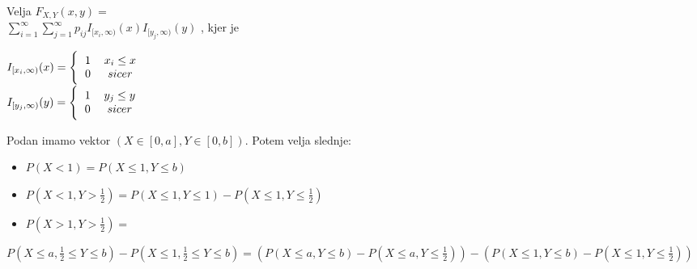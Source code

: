\documentclass{article}
\begin{document}
\begin{multicols}{3}
\begin{enumerate}
\begin{center}
        \end{center}
        Velja
        \begin{math}
            F_{X,Y}(x, y) =
        \end{math}\\
        \begin{math}
            \sum_{i = 1}^{\infty} \sum_{j = 1}^{\infty} p_{ij}  I_{[x_i, \infty)} (x) I_{[y_j, \infty)} (y)
        \end{math}
        , kjer je
        \begin{center}
            \begin{math}
                I_{[x_i, \infty)} (x) = 
                \Bigg\{\begin{tabular}{cc}
                    $1$  & $x_i \leq x$ \\
                    $0$  & $sicer$ \\
                  \end{tabular}
            \end{math} \\
            \begin{math}
                I_{[y_j, \infty)} (y) = 
                \Bigg\{\begin{tabular}{cc}
                    $1$  & $y_j \leq y$ \\
                    $0$  & $sicer$ \\
                  \end{tabular}
            \end{math}
        \end{center}
\end{enumerate}
Podan imamo vektor $(X \in [0, a], Y \in [0,b])$. Potem velja slednje:
\begin{itemize}
    \item $P(X < 1 ) = P(X \leq 1, Y \leq b)$
    \item $P(X < 1, Y > \frac{1}{2}) = P(X \leq 1, Y \leq 1) - P(X \leq 1, Y \leq \frac{1}{2})$
    \item \begin{math}
        P(X > 1, Y > \frac{1}{2}) = 
    \end{math}
\end{itemize}
\begin{center}
    \begin{small}
        \begin{math}
            P(X \leq a, \frac{1}{2} \leq Y \leq b) - P(X \leq 1, \frac{1}{2} \leq Y \leq b) =
            (P(X \leq a, Y \leq b) - P(X \leq a, Y \leq \frac{1}{2})) - (P(X \leq 1, Y \leq b) - P(X \leq 1, Y \leq \frac{1}{2}))
        \end{math}
    \end{small}
\end{center}


\end{multicols}
\end{document}
